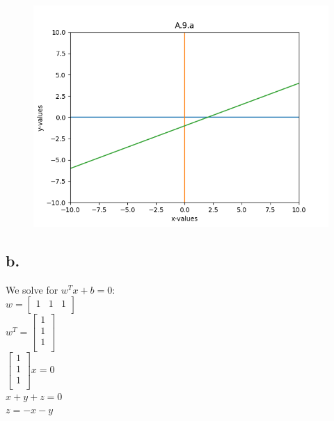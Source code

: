 \documentclass{article}
\newcommand{\1}{\mathbf{1}}
\begin{document}
{\begin{figure}[ht!]
  \centering
  \includegraphics[width=150mm]{A9a.PNG}
\end{figure}

\subsection*{b.}
We solve for $w^T x + b = 0$: \\
$w = \begin{bmatrix} 1 & 1 & 1 \\ \end{bmatrix}$ \\
$w^T = \begin{bmatrix} 1 \\ 1 \\ 1 \\ \end{bmatrix}$ \\
$\begin{bmatrix} 1 \\ 1 \\ 1 \\ \end{bmatrix} x = 0$ \\ 
$x + y + z = 0$ \\
$z = -x - y$ \\

}
\end{document}
